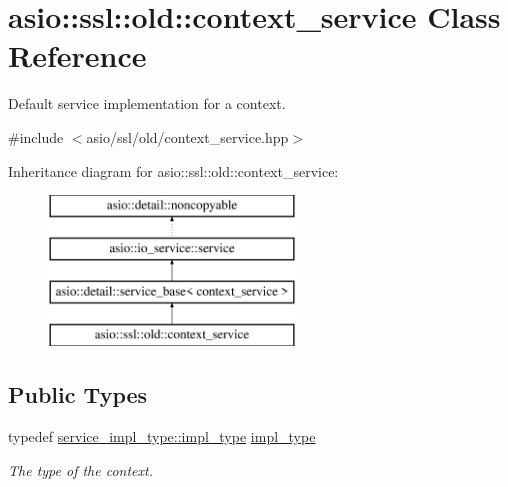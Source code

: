 \hypertarget{classasio_1_1ssl_1_1old_1_1context__service}{}\section{asio\+:\+:ssl\+:\+:old\+:\+:context\+\_\+service Class Reference}
\label{classasio_1_1ssl_1_1old_1_1context__service}


Default service implementation for a context.  




{\ttfamily \#include $<$asio/ssl/old/context\+\_\+service.\+hpp$>$}

Inheritance diagram for asio\+:\+:ssl\+:\+:old\+:\+:context\+\_\+service\+:\begin{figure}[H]
\begin{center}
\leavevmode
\includegraphics[height=4.000000cm]{classasio_1_1ssl_1_1old_1_1context__service}
\end{center}
\end{figure}
\subsection*{Public Types}
\begin{DoxyCompactItemize}
\item 
typedef \hyperlink{classasio_1_1ssl_1_1old_1_1detail_1_1openssl__context__service_a1287914e0f48a9098c9141ca33ecd570}{service\+\_\+impl\+\_\+type\+::impl\+\_\+type} \hyperlink{classasio_1_1ssl_1_1old_1_1context__service_aa082808edcf9f9da07eaf4077d1d8de0}{impl\+\_\+type}
\begin{DoxyCompactList}\small\item\em The type of the context. \end{DoxyCompactList}\end{DoxyCompactItemize}
